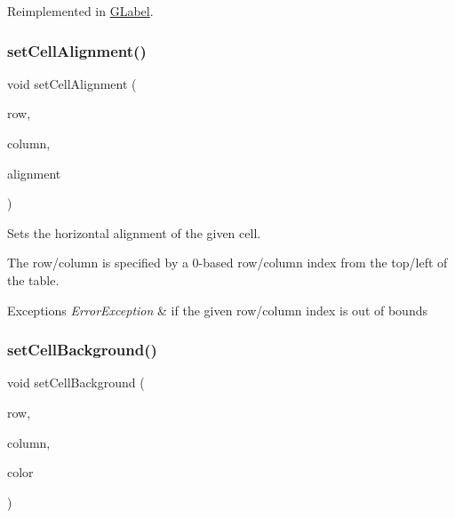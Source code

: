 Reimplemented in \mbox{\hyperlink{classsgl_1_1GLabel_adb836652705fdc4b7e90b7a3afc56a37}{G\+Label}}.

\mbox{\label{classsgl_1_1GTable_a0c1ff398e920da7356b8375b66b9b083}} 
\subsubsection{\texorpdfstring{set\+Cell\+Alignment()}{setCellAlignment()}}
{\footnotesize\ttfamily void set\+Cell\+Alignment (\begin{DoxyParamCaption}\item[{int}]{row,  }\item[{int}]{column,  }\item[{\mbox{\hyperlink{namespacesgl_aa00e70829e72ff16addc4d9f06fe3bc5}{Horizontal\+Alignment}}}]{alignment }\end{DoxyParamCaption})\hspace{0.3cm}{\ttfamily [virtual]}}



Sets the horizontal alignment of the given cell. 

The row/column is specified by a 0-\/based row/column index from the top/left of the table. 
\begin{DoxyExceptions}{Exceptions}
{\em Error\+Exception} & if the given row/column index is out of bounds \\
\hline
\end{DoxyExceptions}
\mbox{\label{classsgl_1_1GTable_a50940b22e500a861451bbff938c8f50b}} 
\subsubsection{\texorpdfstring{set\+Cell\+Background()}{setCellBackground()}\hspace{0.1cm}{\footnotesize\ttfamily [1/2]}}
{\footnotesize\ttfamily void set\+Cell\+Background (\begin{DoxyParamCaption}\item[{int}]{row,  }\item[{int}]{column,  }\item[{int}]{color }\end{DoxyParamCaption})\hspace{0.3cm}{\ttfamily [virtual]}}



